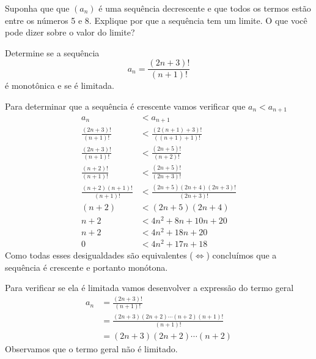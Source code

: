\begin{exercises}

\begin{exercise}
  Suponha que que $(a_n)$ é uma sequência decrescente
  e que todos os termos estão entre os números 5 e 8.
  Explique por que a sequência tem um limite.
  O que você pode dizer sobre o valor do limite?
\end{exercise}

\begin{exercise}
Determine se a sequência
\[
  a_n = \frac{(2n+3)!}{(n+1)!}
\]
é monotônica e se é limitada.
\begin{answer}
  Para determinar que a sequência é crescente vamos verificar que $a_n<a_{n+1}$
  \begin{align*}
  	a_n                        & < a_{n+1}                             \\[2mm]
  	\frac{(2n+3)!}{(n+1)!}     & < \frac{(2(n+1)+3)!}{((n+1)+1)!}      \\[2mm]
  	\frac{(2n+3)!}{(n+1)!}     & < \frac{(2n+5)!}{(n+2)!}              \\[2mm]
  	\frac{(n+2)!}{(n+1)!}      & < \frac{(2n+5)!}{(2n+3)!}             \\[2mm]
  	\frac{(n+2)(n+1)!}{(n+1)!} & < \frac{(2n+5)(2n+4)(2n+3)!}{(2n+3)!} \\
  	(n+2)                      & < (2n+5)(2n+4)                        \\
  	n+2                        & <  4n^2 +8n + 10n +20                 \\
  	n+2                        & <  4n^2 +18n +20                      \\
  	0                          & <  4n^2 +17n +18
  \end{align*}
  Como todas esses desigualdades são equivalentes ($\Leftrightarrow$)
  concluímos que a sequência é crescente e portanto monótona.

  Para verificar se ela é limitada vamos desenvolver a expressão do termo geral
  \begin{align*}
  	a_n & = \frac{(2n+3)!}{(n+1)!}                       \\
  	    & = \frac{(2n+3)(2n+2)\cdots(n+2)(n+1)!}{(n+1)!} \\
  	    & = (2n+3)(2n+2)\cdots(n+2)
  \end{align*}
  Observamos que o termo geral não é limitado.
\end{answer}
\end{exercise}


\end{exercises}

